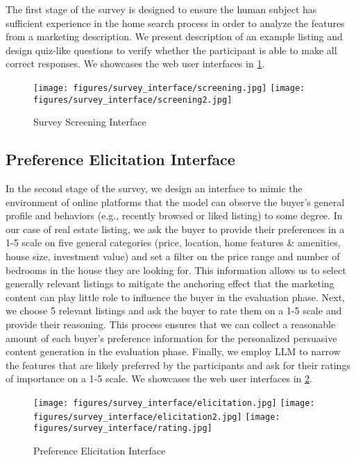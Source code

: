 The first stage of the survey is designed to ensure the human subject has sufficient experience in the home search process in order to analyze the features from a marketing description. We present description of an example listing and design quiz-like questions to verify whether the participant is able to make all correct responses. We showcases the web user interfaces in \cref{fig:screening_interface}.

\begin{figure}[h!]
    \centering
    \texttt{[image: figures/survey\_interface/screening.jpg]}
    \texttt{[image: figures/survey\_interface/screening2.jpg]}
    \caption{Survey Screening Interface}
    \label{fig:screening_interface}
\end{figure}

\subsection{Preference Elicitation Interface}
\label{app: preference-interface}
In the second stage of the survey, we design an interface to mimic the environment of online platforms that the model can observe the buyer's general profile and behaviors (e.g., recently browsed or liked listing) to some degree. In our case of real estate listing, we ask the buyer to provide their preferences in a 1-5 scale on five general categories (price, location, home features \& amenities, house size, investment value) and set a filter on the price range and number of bedrooms in the house they are looking for. This information allows us to select generally relevant listings to mitigate the anchoring effect that the marketing content can play little role to influence the buyer in the evaluation phase. Next, we choose 5 relevant listings and ask the buyer to rate them on a 1-5 scale and provide their reasoning. This process ensures that we can collect a reasonable amount of each buyer's preference information for the personalized persuasive content generation in the evaluation phase. Finally, we employ LLM to narrow the features that are likely preferred by the participants and ask for their ratings of importance on a 1-5 scale.  We showcases the web user interfaces in \cref{fig:preference_elicitation_interface}.

\begin{figure}[h!]
    \centering
    \texttt{[image: figures/survey\_interface/elicitation.jpg]}
    \texttt{[image: figures/survey\_interface/elicitation2.jpg]}
    \texttt{[image: figures/survey\_interface/rating.jpg]}
    \caption{Preference Elicitation Interface}
    \label{fig:preference_elicitation_interface}
\end{figure}

